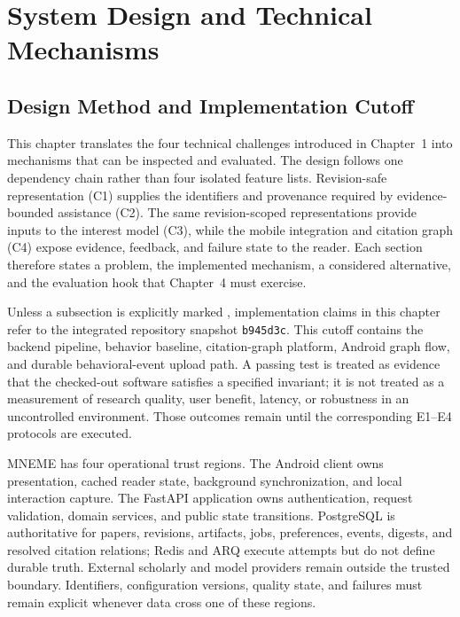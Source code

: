 ﻿%

\chapter{System Design and Technical Mechanisms}

\section{Design Method and Implementation Cutoff}

This chapter translates the four technical challenges introduced in Chapter~1 into mechanisms that can be inspected and evaluated. The design follows one dependency chain rather than four isolated feature lists. Revision-safe representation (C1) supplies the identifiers and provenance required by evidence-bounded assistance (C2). The same revision-scoped representations provide inputs to the interest model (C3), while the mobile integration and citation graph (C4) expose evidence, feedback, and failure state to the reader. Each section therefore states a problem, the implemented mechanism, a considered alternative, and the evaluation hook that Chapter~4 must exercise.

Unless a subsection is explicitly marked \planned{}, implementation claims in this chapter refer to the integrated repository snapshot \texttt{b945d3c}. This cutoff contains the backend pipeline, behavior baseline, citation-graph platform, Android graph flow, and durable behavioral-event upload path. A passing test is treated as evidence that the checked-out software satisfies a specified invariant; it is not treated as a measurement of research quality, user benefit, latency, or robustness in an uncontrolled environment. Those outcomes remain \pending{} until the corresponding E1--E4 protocols are executed.

MNEME has four operational trust regions. The Android client owns presentation, cached reader state, background synchronization, and local interaction capture. The FastAPI application owns authentication, request validation, domain services, and public state transitions. PostgreSQL is authoritative for papers, revisions, artifacts, jobs, preferences, events, digests, and resolved citation relations; Redis and ARQ execute attempts but do not define durable truth. External scholarly and model providers remain outside the trusted boundary. Identifiers, configuration versions, quality state, and failures must remain explicit whenever data cross one of these regions.


